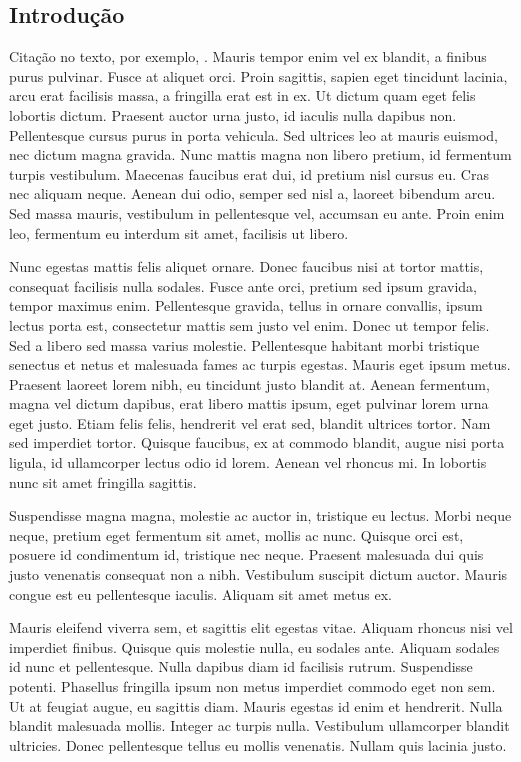 \documentclass[book,A4paper,10pt,twoside,oldfontcommands]{memoir}\usepackage[]{graphicx}\usepackage[usenames,dvipsnames]{color}
\begin{document}
\begin{btUnit}
\chapter{Introdução}

Citação no texto, por exemplo, \citet{Cockerham1996}. Mauris tempor
enim vel ex blandit, a finibus purus pulvinar. Fusce at aliquet orci.
Proin sagittis, sapien eget tincidunt lacinia, arcu erat facilisis
massa, a fringilla erat est in ex. Ut dictum quam eget felis lobortis
dictum. Praesent auctor urna justo, id iaculis nulla dapibus non.
Pellentesque cursus purus in porta vehicula. Sed ultrices leo at
mauris euismod, nec dictum magna gravida. Nunc mattis magna non libero
pretium, id fermentum turpis vestibulum. Maecenas faucibus erat dui,
id pretium nisl cursus eu. Cras nec aliquam neque. Aenean dui odio,
semper sed nisl a, laoreet bibendum arcu. Sed massa mauris, vestibulum
in pellentesque vel, accumsan eu ante. Proin enim leo, fermentum eu
interdum sit amet, facilisis ut libero.

Nunc egestas mattis felis aliquet ornare. Donec faucibus nisi at
tortor mattis, consequat facilisis nulla sodales. Fusce ante orci,
pretium sed ipsum gravida, tempor maximus enim. Pellentesque gravida,
tellus in ornare convallis, ipsum lectus porta est, consectetur mattis
sem justo vel enim. Donec ut tempor felis. Sed a libero sed massa
varius molestie. Pellentesque habitant morbi tristique senectus et
netus et malesuada fames ac turpis egestas. Mauris eget ipsum metus.
Praesent laoreet lorem nibh, eu tincidunt justo blandit at. Aenean
fermentum, magna vel dictum dapibus, erat libero mattis ipsum, eget
pulvinar lorem urna eget justo. Etiam felis felis, hendrerit vel erat
sed, blandit ultrices tortor. Nam sed imperdiet tortor. Quisque
faucibus, ex at commodo blandit, augue nisi porta ligula, id
ullamcorper lectus odio id lorem. Aenean vel rhoncus mi. In lobortis
nunc sit amet fringilla sagittis.

Suspendisse magna magna, molestie ac auctor in, tristique eu lectus.
Morbi neque neque, pretium eget fermentum sit amet, mollis ac nunc.
Quisque orci est, posuere id condimentum id, tristique nec neque.
Praesent malesuada dui quis justo venenatis consequat non a nibh.
Vestibulum suscipit dictum auctor. Mauris congue est eu pellentesque
iaculis. Aliquam sit amet metus ex.

Mauris eleifend viverra sem, et sagittis elit egestas vitae. Aliquam
rhoncus nisi vel imperdiet finibus. Quisque quis molestie nulla, eu
sodales ante. Aliquam sodales id nunc et pellentesque. Nulla dapibus
diam id facilisis rutrum. Suspendisse potenti. Phasellus fringilla
ipsum non metus imperdiet commodo eget non sem. Ut at feugiat augue,
eu sagittis diam. Mauris egestas id enim et hendrerit. Nulla blandit
malesuada mollis. Integer ac turpis nulla. Vestibulum ullamcorper
blandit ultricies. Donec pellentesque tellus eu mollis venenatis.
Nullam quis lacinia justo.


\end{btUnit}
\end{document}
